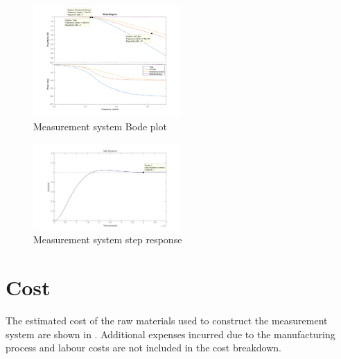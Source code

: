 \documentclass[10pt,twocolumn]{witseiepaper}
\begin{document}
\begin{figure}[h!]
	\centering
	\includegraphics[width=0.5\textwidth]{bode_updated}
	\caption{Measurement system Bode plot}
	\label{fig:bode}
\end{figure}

\begin{figure}[h!]
	\centering
	\includegraphics[width=0.5\textwidth]{filterStep}
	\caption{Measurement system step response}
	\label{fig:step}
\end{figure}

\section{Cost}

The estimated cost of the raw materials used to construct the measurement system are shown in . Additional expenses incurred due to the manufacturing process and labour costs are not included in the cost breakdown.
\end{document}
